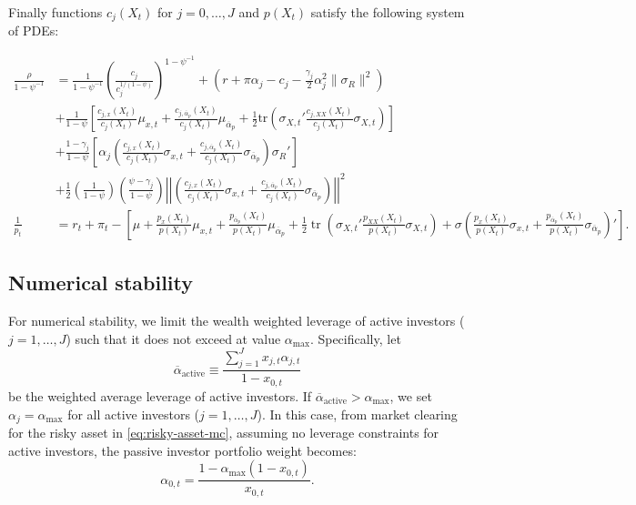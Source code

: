 \documentclass[12pt,english]{article}
\DeclareMathOperator{\tr}{tr}
\begin{document}
Finally functions $ c_j(X_t) $ for $ j=0,\ldots,J $ and $ p(X_t) $ satisfy the following system of PDEs:
\begin{footnotesize}
	\begin{align}\label{eq:PDEs}
		\frac{\rho}{1-\psi^{-1}}&=\frac{1}{1-\psi^{-1}}\left(\frac{c_j}{c_j^{1/(1-\psi)}}\right)^{1-\psi^{-1}}+
		\left(r+\pi\alpha_{j}-c_j-\frac{\gamma_j}{2}\alpha_j^2\|\sigma_{R}\|^2\right)\nonumber\\
		&+\frac{1}{1-\psi}\left[\frac{c_{j,x}(X_t)}{c_j(X_t)}\mu_{x,t}+\frac{c_{j,\overline{\alpha}_p}(X_t)}{c_j(X_t)}\mu_{\overline{\alpha}_p}+
		\frac{1}{2}\text{tr}\left(\sigma_{X,t}'\frac{c_{j,XX}(X_t)}{c_j(X_t)}\sigma_{X,t}\right)\right]\nonumber\\
		&+\frac{1-\gamma_j}{1-\psi}\left[\alpha_j\left(\frac{c_{j,x}(X_t)}{c_j(X_t)} \sigma_{x,t} + \frac{c_{j,{\overline{\alpha}_p}}(X_t)}{c_j(X_t)}\sigma_{\overline{\alpha}_p}\right)\sigma_R'\right]\nonumber\\
		&+\frac{1}{2}\left(\frac{1}{1-\psi}\right)\left(\frac{\psi-\gamma_j}{1-\psi}\right)\left|\left|\left(\frac{c_{j,x}(X_t)}{c_j(X_t)} \sigma_{x,t} + \frac{c_{j,{\overline{\alpha}_p}}(X_t)}{c_j(X_t)}\sigma_{\overline{\alpha}_p}\right)\right|\right|^2\\
		\frac{1}{p_t} &= r_t + \pi_t  -\left[\mu +\frac{p_x(X_t)}{p(X_t)}\mu_{x,t}+\frac{p_{\overline{\alpha}_p}(X_t)}{p(X_t)}\mu_{\overline{\alpha}_p}+\frac{1}{2}\tr\left(\sigma_{X,t}'\frac{p_{XX}(X_t)}{p(X_t)}\sigma_{X,t}\right) + \sigma \left(\frac{p_x(X_t)}{p(X_t)} \sigma_{x,t} + \frac{p_{\overline{\alpha}_p}(X_t)}{p(X_t)} \sigma_{\overline{\alpha}_p}\right)'\right].
	\end{align}
\end{footnotesize}

\subsection{Numerical stability}
For numerical stability, we limit the wealth weighted leverage of active investors ($j=1,\ldots,J$) such that it does not exceed at value $\alpha_{\mathrm{max}}$. Specifically, let
\[\overline{\alpha}_{\mathrm{active}}\equiv\frac{\sum_{j=1}^J x_{j,t}\alpha_{j,t}}{1-x_{0,t}}\]
be the weighted average leverage of active investors. If $\overline{\alpha}_{\mathrm{active}}>\alpha_{\mathrm{max}}$, we set $\alpha_j=\alpha_{\mathrm{max}}$ for all active investors ($j=1,\ldots,J$). In this case, from market clearing for the risky asset in \eqref{eq:risky-asset-mc}, assuming no leverage constraints for active investors, the passive investor portfolio weight becomes:
\[\alpha_{0,t}=\frac{1-\alpha_{\mathrm{max}}(1-x_{0,t})}{x_{0,t}}.\]
\end{document}
